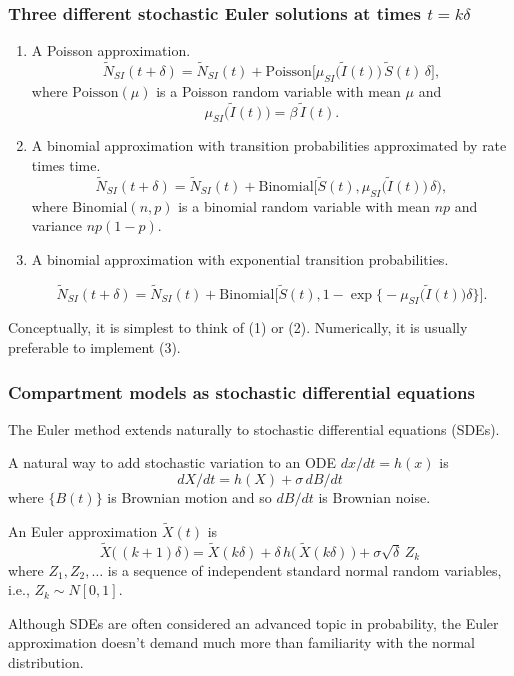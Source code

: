 \documentclass{beamer}\usepackage[]{graphicx}\usepackage[]{color}
\begin{document}
\begin{frame}[fragile]
\frametitle{Three different stochastic Euler solutions at times $t=k\delta$}

\begin{enumerate}
\item A Poisson approximation.
$$\tilde N_{SI}(t+\delta)= \tilde N_{SI}(t) + \mathrm{Poisson}\big[\mu_{SI}\big(\tilde I(t)\big) \, \tilde S(t) \,\delta\big],$$
where $\mathrm{Poisson}(\mu)$ is a Poisson random variable with mean $\mu$ and 
$$\mu_{SI}\big(\tilde I(t)\big) = \beta\, \tilde I(t).$$

\item A binomial approximation with transition probabilities approximated by rate times time.
$$\tilde N_{SI}(t+\delta) = \tilde N_{SI}(t) + \mathrm{Binomial}\big[\tilde S(t),\mu_{SI}\big(\tilde I(t)\big) \, \delta\big),$$
where $\mathrm{Binomial}(n,p)$ is a binomial random variable with mean $np$ and variance $np(1-p)$.

\item A binomial approximation with exponential transition probabilities. 

$$ \tilde N_{SI}(t+\delta)= \tilde N_{SI}(t) + \mathrm{Binomial}\big[\tilde S(t),1-\exp\big\{-\mu_{SI}\big(\tilde I(t)\big) \delta\big\}\big].$$

\end{enumerate}

\bi
\item Conceptually, it is simplest to think of (1) or (2). Numerically, it is usually preferable to implement (3). 
\ei

\end{frame}

 \begin{frame}[fragile]

 \frametitle{Compartment models as stochastic differential equations}
 
 \bi
 \item The Euler method extends naturally to stochastic differential equations (SDEs).
 
 \item A natural way to add stochastic variation to an ODE $dx/dt=h(x)$ is
 $$ dX/dt = h(X) + \sigma \, dB/dt$$
 where $\{B(t)\}$ is Brownian motion and so $dB/dt$ is Brownian noise.

 \item An Euler approximation $\tilde X(t)$ is 
 $$ \tilde X\big( \,(k+1)\delta\,\big) = \tilde X( k\delta) + \delta\, h\big(\, \tilde X(k\delta)\,\big) + \sigma \sqrt{\delta} \, Z_k$$
 where $Z_1,Z_2,\dots$ is a sequence of independent standard normal random variables, i.e.,  $Z_k\sim N[0,1]$.

 \item Although SDEs are often considered an advanced topic in probability, the Euler approximation doesn't demand much more than familiarity with the normal distribution.
 
 \ei

 \end{frame}
\end{document}
